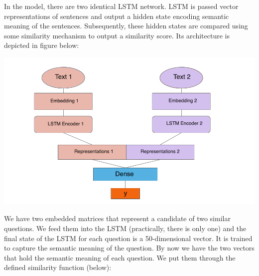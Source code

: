 \documentclass[runningheads]{llncs}
\begin{document}
	In the model, there are two identical LSTM network. LSTM is passed vector representations of sentences and output a hidden state encoding semantic meaning of the sentences. Subsequently, these hidden states are compared using some similarity mechanism to output a similarity score.
	Its architecture is depicted in figure below:
	
	\begin{minipage}{\linewidth}
		\begin{center}
			\includegraphics[width=\linewidth]{Siamese_Network.png}
			\label{fig:Siamese LSTM Architectture}
		\end{center}
	\end{minipage}
	\afterpage{\clearpage}
	
	We have two embedded matrices that represent a candidate of two similar questions.  We feed them into the LSTM (practically, there is only one) and the final state of the LSTM for each question is a 50-dimensional vector. It is trained to capture the semantic meaning of the question. By now we have the two vectors that hold the semantic meaning of each question. We put them through the defined similarity function (below):
\newline

	\begin{minipage}{\linewidth}
		\begin{center}
		\end{center}
	\end{minipage}
	\afterpage{\clearpage}
\end{document}

